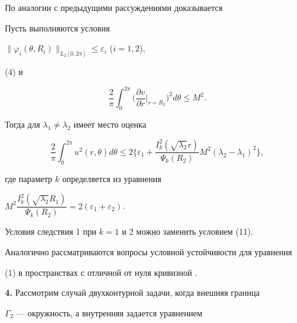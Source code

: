 По аналогии с предыдущими рассуждениями доказывается 


 


\begin{cor} 


Пусть выполняются условия 


$\|\varphi_i(\theta,R_i)\|_{L_2[0,2\pi]}\le\varepsilon_i$ ($i=1,2$), 


(4) и 


$$ 


\frac{2}{\pi}\int^{2\pi}_0\biggl(\frac{\partial v}{\partial r} 


\bigg|_{r=R_2}\biggr)^2d\theta\le M^2. 


$$ 


Тогда для $\lambda_1\ne\lambda_2$ имеет место оценка 


$$ 


\frac{2}{\pi}\int^{2\pi}_0 u^2(r,\theta)d\theta\le2\bigg\{ 


\varepsilon_1+ 


\frac{I^2_k(\sqrt{\lambda_2}r)}{\Psi_k(R_2)}M^2 


(\lambda_2-\lambda_1)^2\bigg\}, 


$$ 


где параметр $k$ определяется из уравнения 


$M^2\dfrac{I^2_k(\sqrt{\lambda_2}R_1)}{\Psi_k(R_2)}= 


2(\varepsilon_1+\varepsilon_2)$. 


\end{cor} 


 


\begin{note} 


Условия следствия 1 при $k=1$ и 2 можно заменить условием (11). 


\end{note} 


 


Аналогично рассматриваются вопросы условной устойчивости для уравнения 


(1) в пространствах с отличной от нуля кривизной \cite{3}. 


\medskip 


 


{\bf 4.} Рассмотрим случай двухконтурной задачи, когда внешняя граница 


$\Gamma_2$ --- окружность, а внутренняя задается уравнением 


